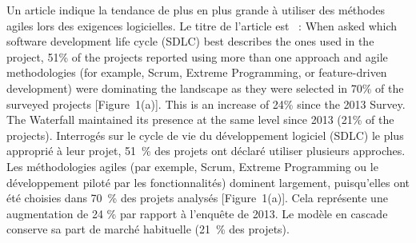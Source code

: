 {Un article indique la tendance de plus en plus grande à utiliser des méthodes agiles lors des exigences logicielles. Le titre de l'article est ~:
\quoteenfr
{When asked which software development life cycle (SDLC) best describes the ones used in the project, 51\% of the projects reported using more than one approach and agile methodologies (for example, Scrum, Extreme Programming, or feature-driven development) were dominating the landscape as they were selected in 70\% of the surveyed projects [Figure~1(a)]. This is an increase of 24\% since the 2013 Survey. The Waterfall maintained its presence at the same level since 2013 (21\% of the projects).}
{Interrogés sur le cycle de vie du développement logiciel (SDLC) le plus approprié à leur projet, 51~\% des projets ont déclaré utiliser plusieurs approches. Les méthodologies agiles (par exemple, Scrum, Extreme Programming ou le développement piloté par les fonctionnalités) dominent largement, puisqu'elles ont été choisies dans 70~\% des projets analysés [Figure~1(a)]. Cela représente une augmentation de 24 \% par rapport à l'enquête de 2013. Le modèle en cascade conserve sa part de marché habituelle (21~\% des projets).}
{\cite{kassab_current_2022}}

}
